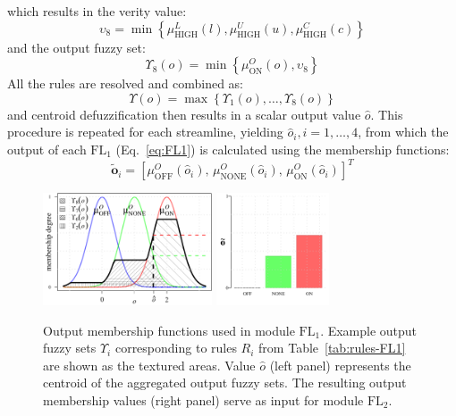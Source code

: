 which results in the verity value:
\begin{equation}
\upsilon_{8} = \min\left\{\mu_{\textrm{HIGH}}^{L}(l), \mu_{\textrm{HIGH}}^{U}(u), \mu_{\textrm{HIGH}}^{C}(c)\right\}
\end{equation}
and the output fuzzy set: 
\begin{equation}
\Upsilon_{8}(o) = \min\left\{\mu_{\textrm{ON}}^{O}(o),\upsilon_{8}\right\}
\end{equation}
All the rules are resolved and combined as:
\begin{equation}
\Upsilon(o) = \max\left\{\Upsilon_{1}(o),\dots,\Upsilon_{8}(o)\right\}
\end{equation}
and centroid defuzzification then results in a scalar output value $\hat{o}$. This procedure is repeated for each streamline, yielding $\hat{o}_{i}, i=1,\dots,4$, from which the output of each $\mathrm{FL}_{1}$ (Eq.~\ref{eq:FL1}) is calculated using the membership functions:
\begin{equation}
\tilde{\mathbf{o}}_{i} = \left[\mu_{\textrm{OFF}}^{O}(\hat{o}_{i}),\, \mu_{\textrm{NONE}}^{O}(\hat{o}_{i}),\, \mu_{\textrm{ON}}^{O}(\hat{o}_{i})\right]^{T}
\end{equation}

\begin{figure}
	\centering
	\includegraphics[height=9em]{fig9a_embedded}
	\includegraphics[height=9em]{fig9b_embedded}
	\caption{Output membership functions used in module $\mathrm{FL}_{1}$. Example output fuzzy sets $\Upsilon_{\!i}$ corresponding to rules $R_i$ from Table~\ref{tab:rules-FL1} are shown as the textured areas. Value $\hat{o}$ (left panel) represents the centroid of the aggregated output fuzzy sets. The resulting output membership values (right panel) serve as input for module $\mathrm{FL}_{2}$.}
	\label{ch2_fig9}
\end{figure}

